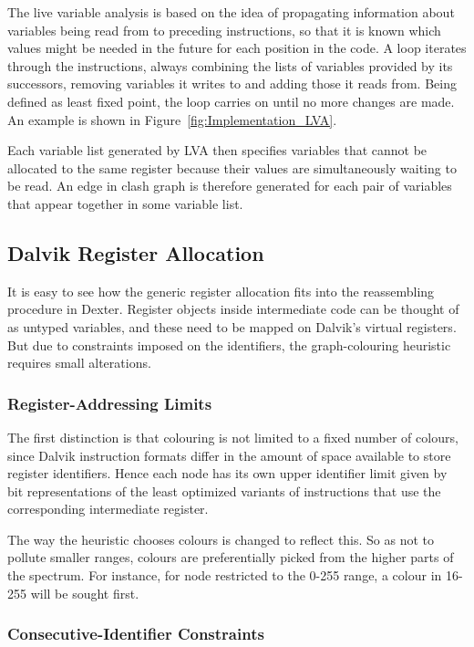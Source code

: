 \documentclass[12pt,twoside,notitlepage]{report}
\begin{document}
The live variable analysis is based on the idea of propagating information about variables being read from to preceding instructions, so that it is known which values might be needed in the future for each position in the code. A loop iterates through the instructions, always combining the lists of variables provided by its successors, removing variables it writes to and adding those it reads from. Being defined as least fixed point, the loop carries on until no more changes are made. An example is shown in Figure~\ref{fig:Implementation_LVA}.

Each variable list generated by LVA then specifies variables that cannot be allocated to the same register because their values are simultaneously waiting to be read. An edge in clash graph is therefore generated for each pair of variables that appear together in some variable list.

\subsection{Dalvik Register Allocation}

It is easy to see how the generic register allocation fits into the reassembling procedure in Dexter. Register objects inside intermediate code can be thought of as untyped variables, and these need to be mapped on Dalvik's virtual registers. But due to constraints imposed on the identifiers, the graph-colouring heuristic requires small alterations.

\subsubsection{Register-Addressing Limits}

The first distinction is that colouring is not limited to a fixed number of colours, since Dalvik instruction formats differ in the amount of space available to store register identifiers. Hence each node has its own upper identifier limit given by bit representations of the least optimized variants of instructions that use the corresponding intermediate register.

The way the heuristic chooses colours is changed to reflect this. So as not to pollute smaller ranges, colours are preferentially picked from the higher parts of the spectrum. For instance, for node restricted to the \mbox{0-255} range, a colour in \mbox{16-255} will be sought first.

\subsubsection{Consecutive-Identifier Constraints}
\end{document}
